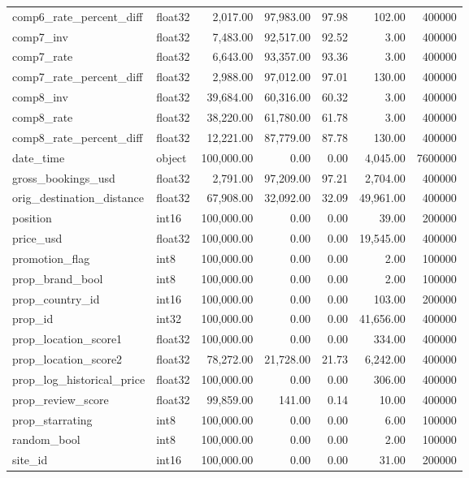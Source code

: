 \begin{table}
\begin{tabular}{llrrrrr}
comp6\_rate\_percent\_diff & float32 & 2,017.00 & 97,983.00 & 97.98 & 102.00 & 400000 \\
comp7\_inv & float32 & 7,483.00 & 92,517.00 & 92.52 & 3.00 & 400000 \\
comp7\_rate & float32 & 6,643.00 & 93,357.00 & 93.36 & 3.00 & 400000 \\
comp7\_rate\_percent\_diff & float32 & 2,988.00 & 97,012.00 & 97.01 & 130.00 & 400000 \\
comp8\_inv & float32 & 39,684.00 & 60,316.00 & 60.32 & 3.00 & 400000 \\
comp8\_rate & float32 & 38,220.00 & 61,780.00 & 61.78 & 3.00 & 400000 \\
comp8\_rate\_percent\_diff & float32 & 12,221.00 & 87,779.00 & 87.78 & 130.00 & 400000 \\
date\_time & object & 100,000.00 & 0.00 & 0.00 & 4,045.00 & 7600000 \\
gross\_bookings\_usd & float32 & 2,791.00 & 97,209.00 & 97.21 & 2,704.00 & 400000 \\
orig\_destination\_distance & float32 & 67,908.00 & 32,092.00 & 32.09 & 49,961.00 & 400000 \\
position & int16 & 100,000.00 & 0.00 & 0.00 & 39.00 & 200000 \\
price\_usd & float32 & 100,000.00 & 0.00 & 0.00 & 19,545.00 & 400000 \\
promotion\_flag & int8 & 100,000.00 & 0.00 & 0.00 & 2.00 & 100000 \\
prop\_brand\_bool & int8 & 100,000.00 & 0.00 & 0.00 & 2.00 & 100000 \\
prop\_country\_id & int16 & 100,000.00 & 0.00 & 0.00 & 103.00 & 200000 \\
prop\_id & int32 & 100,000.00 & 0.00 & 0.00 & 41,656.00 & 400000 \\
prop\_location\_score1 & float32 & 100,000.00 & 0.00 & 0.00 & 334.00 & 400000 \\
prop\_location\_score2 & float32 & 78,272.00 & 21,728.00 & 21.73 & 6,242.00 & 400000 \\
prop\_log\_historical\_price & float32 & 100,000.00 & 0.00 & 0.00 & 306.00 & 400000 \\
prop\_review\_score & float32 & 99,859.00 & 141.00 & 0.14 & 10.00 & 400000 \\
prop\_starrating & int8 & 100,000.00 & 0.00 & 0.00 & 6.00 & 100000 \\
random\_bool & int8 & 100,000.00 & 0.00 & 0.00 & 2.00 & 100000 \\
site\_id & int16 & 100,000.00 & 0.00 & 0.00 & 31.00 & 200000 \\

\end{tabular}
\end{table}
